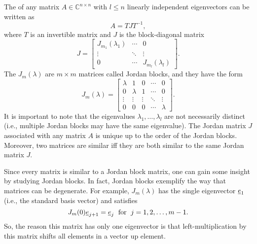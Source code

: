 \begin{definition}
The  of any matrix $A\in \mathbb{C}^{n \times n}$ with $l \leq n$ linearly independent eigenvectors can be written as
\begin{equation*}
A = T J T^{-1} ,
\end{equation*}
where $T$ is an invertible matrix and $J$ is the block-diagonal matrix
\begin{equation*}
J = \begin{bmatrix}
J_{m_1}(\lambda_1) & \cdots & 0 \\
\vdots & \ddots & \vdots \\
0 & \cdots & J_{m_l}(\lambda_l)
\end{bmatrix} .
\end{equation*}
The $J_m (\lambda)$ are $m\times m$ matrices called Jordan blocks, and they have the form
\begin{equation*}
J_m (\lambda) = \begin{bmatrix}
\lambda & 1 & 0 &\cdots & 0 \\
0 & \lambda & 1 & \cdots & 0 \\
\vdots & \vdots & \vdots & \ddots & \vdots \\
0 & 0 & 0 & \cdots & \lambda
\end{bmatrix} .
\end{equation*}
It is important to note that the eigenvalues $\lambda_1, \ldots, \lambda_l$ are not necessarily distinct (i.e., multiple Jordan blocks may have the same eigenvalue).
The Jordan matrix $J$ associated with any matrix $A$ is unique up to the order of the Jordan blocks.
Moreover, two matrices are similar iff they are both similar to the same Jordan matrix $J$.
\end{definition}


Since every matrix is similar to a Jordan block matrix, one can gain some insight by studying Jordan blocks.
In fact, Jordan blocks exemplify the way that matrices can be degenerate.
For example, $J_m (\lambda)$ has the single eigenvector $\underline{e}_1$ (i.e., the standard basis vector) and satisfies
\[ J_m (0) \underline{e}_{j+1} = \underline{e}_j \; \textrm{ for } \; j=1,2,\ldots,m-1. \]
So, the reason this matrix has only one eigenvector is that left-multiplication by this matrix shifts all elements in a vector up element.

